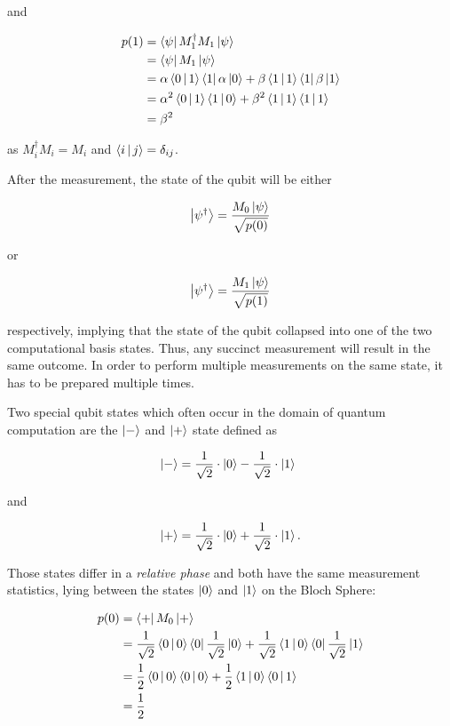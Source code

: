 and

\begin{align}
  p(1) &= \Bra{\psi} M_1^{\dagger} M_1 \Ket{\psi} \\
       &= \Bra{\psi} M_1 \Ket{\psi} \\
       &= \alpha \Braket{0|1} \Bra{1} \alpha \Ket{0} + \beta \Braket{1|1} \Bra{1} \beta \Ket{1} \\
       &= \alpha^2 \Braket{0|1} \Braket{1|0} + \beta^2 \Braket{1|1} \Braket{1|1} \\
       &= \beta^2
\end{align}

as $M_i^{\dagger}M_i = M_i$ and $\Braket{i|j} = \delta_{ij}$.

After the measurement, the state of the qubit will be either

\begin{equation}
  \Ket{\psi^{\dagger}} = \frac{M_0 \Ket{\psi}}{\sqrt{p(0)}}
\end{equation}

or

\begin{equation}
  \Ket{\psi^{\dagger}} = \frac{M_1 \Ket{\psi}}{\sqrt{p(1)}}
\end{equation}

respectively, implying that the state of the qubit collapsed into one of the two computational
basis states. Thus, any succinct measurement will result in the same outcome.
In order to perform multiple measurements on the same state, it has to be prepared multiple times.

Two special qubit states which often occur in the domain of quantum computation are the $\Ket{-}$ and $\Ket{+}$ state defined as

\begin{equation}
  \Ket{-} = \frac{1}{\sqrt{2}} \cdot \Ket{0} - \frac{1}{\sqrt{2}} \cdot \Ket{1} \phantom{.}
\end{equation}

and

\begin{equation}
  \Ket{+} = \frac{1}{\sqrt{2}} \cdot \Ket{0} + \frac{1}{\sqrt{2}} \cdot \Ket{1}.
\end{equation}

Those states differ in a \textit{relative phase} and both have the same measurement statistics, lying between the states $\Ket{0}$ and
$\Ket{1}$ on the Bloch Sphere:

\begin{align}
  p(0) &= \Bra{+} M_0 \Ket{+} \\
       &= \frac{1}{\sqrt{2}} \Braket{0|0} \Bra{0} \frac{1}{\sqrt{2}} \Ket{0} + \frac{1}{\sqrt{2}} \Braket{1|0} \Bra{0} \frac{1}{\sqrt{2}} \Ket{1} \\
       &= \frac{1}{2} \Braket{0|0} \Braket{0|0} + \frac{1}{2} \Braket{1|0} \Braket{0|1} \\
       &= \frac{1}{2}
\end{align}


